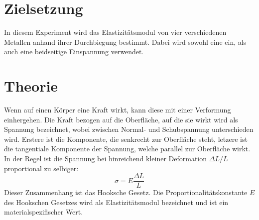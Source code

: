 \section{Zielsetzung}
In diesem Experiment wird das Elastizitätsmodul von vier verschiedenen Metallen anhand ihrer Durchbiegung bestimmt. Dabei wird sowohl eine ein, als auch 
eine beidseitige Einspannung verwendet.
\section{Theorie}
Wenn auf einen Körper eine Kraft wirkt, kann diese mit einer Verformung einhergehen. Die Kraft bezogen auf die Oberfläche, auf die sie wirkt wird als Spannung bezeichnet, wobei 
zwischen Normal- und Schubspannung unterschieden wird. Erstere ist die Komponente, die senkrecht zur Oberfläche steht, letzere ist die tangentiale Komponente der Spannung, welche parallel zur Oberfläche wirkt. In der Regel ist die Spannung bei hinreichend kleiner Deformation $\Delta L/L$ proportional zu selbiger:
\begin{equation}
\sigma=E\frac{\Delta L}{L}
\end{equation}
Dieser Zusammenhang ist das Hooksche Gesetz. Die Proportionalitätskonstante $E$ des Hookschen Gesetzes wird als Elastizitätsmodul bezeichnet und ist ein 
materialspezifischer Wert. \\
